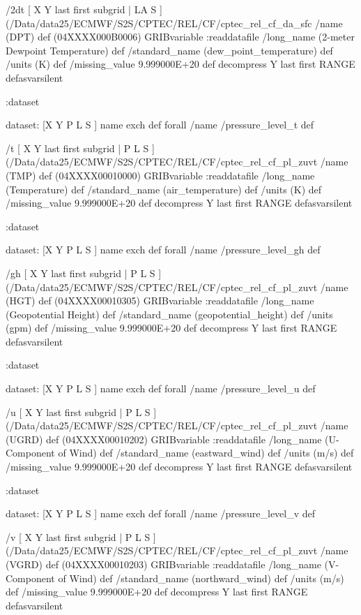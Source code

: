 \begin{ingrid}
{/2dt { [ X Y last first subgrid | LA S ] (/Data/data25/ECMWF/S2S/CPTEC/REL/CF/cptec_rel_cf_da_sfc%
  /name (DPT) def
  (04XXXX000B0006) GRIBvariable
  :readdatafile
  /long_name (2-meter Dewpoint Temperature) def
  /standard_name (dew_point_temperature) def
  /units (K) def
  /missing_value 9.999000E+20 def
  decompress
  Y last first RANGE
} defasvarsilent

:dataset

dataset:
[X Y P L S ] {name exch def } forall
/name /pressure_level_t def

/t { [ X Y last first subgrid | P L S ] (/Data/data25/ECMWF/S2S/CPTEC/REL/CF/cptec_rel_cf_pl_zuvt%
  /name (TMP) def
  (04XXXX00010000) GRIBvariable
  :readdatafile
  /long_name (Temperature) def
  /standard_name (air_temperature) def
  /units (K) def
  /missing_value 9.999000E+20 def
  decompress
  Y last first RANGE
} defasvarsilent

:dataset

dataset:
[X Y P L S ] {name exch def } forall
/name /pressure_level_gh def

/gh { [ X Y last first subgrid | P L S ] (/Data/data25/ECMWF/S2S/CPTEC/REL/CF/cptec_rel_cf_pl_zuvt%
  /name (HGT) def
  (04XXXX00010305) GRIBvariable
  :readdatafile
  /long_name (Geopotential Height) def
  /standard_name (geopotential_height) def
  /units (gpm) def
  /missing_value 9.999000E+20 def
  decompress
  Y last first RANGE
} defasvarsilent

:dataset

dataset:
[X Y P L S ] {name exch def } forall
/name /pressure_level_u def

/u { [ X Y last first subgrid | P L S ] (/Data/data25/ECMWF/S2S/CPTEC/REL/CF/cptec_rel_cf_pl_zuvt%
  /name (UGRD) def
  (04XXXX00010202) GRIBvariable
  :readdatafile
  /long_name (U-Component of Wind) def
  /standard_name (eastward_wind) def
  /units (m/s) def
  /missing_value 9.999000E+20 def
  decompress
  Y last first RANGE
} defasvarsilent

:dataset

dataset:
[X Y P L S ] {name exch def } forall
/name /pressure_level_v def

/v { [ X Y last first subgrid | P L S ] (/Data/data25/ECMWF/S2S/CPTEC/REL/CF/cptec_rel_cf_pl_zuvt%
  /name (VGRD) def
  (04XXXX00010203) GRIBvariable
  :readdatafile
  /long_name (V-Component of Wind) def
  /standard_name (northward_wind) def
  /units (m/s) def
  /missing_value 9.999000E+20 def
  decompress
  Y last first RANGE
} defasvarsilent

}
\end{ingrid}
